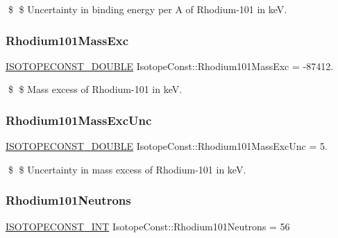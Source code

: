 \$ \$ Uncertainty in binding energy per A of Rhodium-\/101 in keV. \mbox{\label{group___isotope_const-_rhodium-_rh101_ga5cec57b1f6f362ee5c50671dc77ac47d}} 
\subsubsection{\texorpdfstring{Rhodium101\+Mass\+Exc}{Rhodium101MassExc}}
{\footnotesize\ttfamily \mbox{\hyperlink{group___isotope_const-_macros_ga8f45a7272ce02c0b4c65c44636ed719a}{I\+S\+O\+T\+O\+P\+E\+C\+O\+N\+S\+T\+\_\+\+D\+O\+U\+B\+LE}} Isotope\+Const\+::\+Rhodium101\+Mass\+Exc = -\/87412.}

\$ \$ Mass excess of Rhodium-\/101 in keV. \mbox{\label{group___isotope_const-_rhodium-_rh101_gabf242d54574ddd723c420ab378fb5e1e}} 
\subsubsection{\texorpdfstring{Rhodium101\+Mass\+Exc\+Unc}{Rhodium101MassExcUnc}}
{\footnotesize\ttfamily \mbox{\hyperlink{group___isotope_const-_macros_ga8f45a7272ce02c0b4c65c44636ed719a}{I\+S\+O\+T\+O\+P\+E\+C\+O\+N\+S\+T\+\_\+\+D\+O\+U\+B\+LE}} Isotope\+Const\+::\+Rhodium101\+Mass\+Exc\+Unc = 5.}

\$ \$ Uncertainty in mass excess of Rhodium-\/101 in keV. \mbox{\label{group___isotope_const-_rhodium-_rh101_gaf6b99a598c3f915d3813b280d012a056}} 
\subsubsection{\texorpdfstring{Rhodium101\+Neutrons}{Rhodium101Neutrons}}
{\footnotesize\ttfamily \mbox{\hyperlink{group___isotope_const-_macros_ga5f18360b3e99483a35c32d789e62621c}{I\+S\+O\+T\+O\+P\+E\+C\+O\+N\+S\+T\+\_\+\+I\+NT}} Isotope\+Const\+::\+Rhodium101\+Neutrons = 56}

